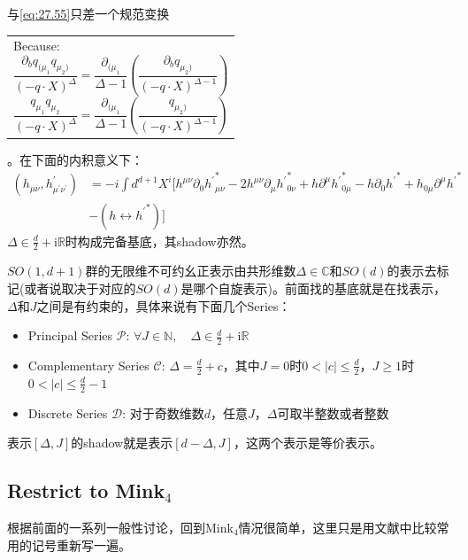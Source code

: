 与\ref{eq:27.55}只差一个规范变换\begin{margintable}\footnotesize 
	\begin{tabularx}{\marginparwidth}{|X}
		Because:
		\[\frac{\partial_bq_{(\mu_1}q_{\mu_2)}}{(-q\cdot X)^\Delta}=\frac{\partial_{(\mu_1}}{\Delta-1}\left(\frac{\partial_bq_{\mu_2)}}{(-q\cdot X)^{\Delta-1}}\right)\]
		\[\frac{q_{\mu_1}q_{\mu_2}}{(-q\cdot X)^\Delta}=\frac{\partial_{(\mu_1}}{\Delta-1}\left(\frac{q_{\mu_2)}}{(-q\cdot X)^{\Delta-1}}\right)\]
	\end{tabularx}
\end{margintable}。在下面的内积意义下：
\begin{equation}
	\begin{aligned}
		(h_{\mu\nu},h_{\mu^{\prime}\nu^{\prime}}^{\prime})& =-i\int d^{d+1}X^{i}\Big[h^{\mu\nu}\partial_{0}{h^{\prime}}_{\mu\nu}^{*}-2h^{\mu\nu}\partial_{\mu}{h^{\prime}}_{0\nu}^{*}+h\partial^{\mu}{h^{\prime}}_{0\mu}^{*}-h\partial_{0}{h^{\prime}}^{*}+h_{0\mu}{\partial^{\mu}{h^{\prime}}^{*}}  \\
		&-(h\leftrightarrow{h^{\prime}}^{*})\Big]
	\end{aligned}
\end{equation}
$\boxed{\Delta\in\frac{d}{2}+\mathrm{i}\mathbb{R}}$时构成完备基底，其shadow亦然。
\begin{remark}
	$SO(1,d+1)$群的无限维不可约幺正表示由共形维数$\Delta\in\mathbb{C}$和$SO(d)$的表示去标记(或者说取决于对应的$SO(d)$是哪个自旋表示)。前面找的基底就是在找表示，$\Delta$和$J$之间是有约束的，具体来说有下面几个Series：
	\begin{itemize}
		\item Principal Series $\mathcal{P}$: $\forall J\in\mathbb{N},\quad \Delta\in\frac{d}{2}+\mathrm{i}\mathbb{R}$
		\item Complementary Series $\mathcal{C}$: $\Delta=\frac{d}{2}+c$，其中$J=0$时$0<|c|\leq\frac{d}{2}$，$J\geq 1$时$0<|c|\leq\frac{d}{2}-1$
		\item Discrete Series $\mathcal{D}$: 对于奇数维数$d$，任意$J$，$\Delta$可取半整数或者整数
	\end{itemize}
	表示$[\Delta,J]$的shadow就是表示$[d-\Delta,J]$，这两个表示是等价表示。
\end{remark}
\subsection{Restrict to Mink$_{4}$}
根据前面的一系列一般性讨论，回到Mink$_{4}$情况很简单，这里只是用文献中比较常用的记号重新写一遍。

